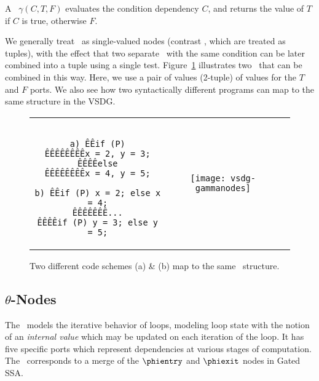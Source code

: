 A \Gn\ $\gamma(C, T, F)$ evaluates the condition dependency $C$, and returns the value of $T$ if $C$ is true, otherwise $F$.

%
We generally treat \Gns\ as single-valued nodes (contrast \Tns, which are treated as tuples), with the effect that two separate \Gns\ with the same condition can be later combined into a tuple using a single test. 
Figure~\ref{fig:twinPhis} illustrates two \Gns\ that can be combined in this way. 
Here, we use a pair of values (2-tuple) of values for the $T$ and $F$ ports. 
We also see how two syntactically different programs can map to the same structure in the VSDG.

\begin{figure}[!hb]
\centering
\begin{tabular}{ccc}	\cline{1-1}
\begin{minipage}[l]{2.0in}
\begin{verbatim}

a) ÊÊif (P)
ÊÊÊÊÊÊÊÊx = 2, y = 3;
ÊÊÊÊelse
ÊÊÊÊÊÊÊÊx = 4, y = 5;

b) ÊÊif (P) x = 2; else x = 4;
ÊÊÊÊÊÊÊ...
ÊÊÊÊif (P) y = 3; else y = 5;

\end{verbatim}
\end{minipage}	
& \hspace {0.2in}
\begin{minipage}[m][\height][l]{1.6in}
\texttt{[image: vsdg-gammanodes]}
\end{minipage} \\ \cline{1-1}
\end{tabular}

\caption{Two different code schemes (a) \& (b) map to the same
\Gn\ structure.}

\label{fig:twinPhis}
\end{figure}


\subsection{$\theta$-Nodes}

The \Tn\ models the iterative behavior of loops, modeling loop state with the notion of an \emph{internal value} which may be updated on each iteration of the loop. 
It has five specific ports which represent dependencies at various stages of computation. 
The \Tn\ corresponds to a merge of the $\phientry$ and $\phiexit$ nodes in Gated SSA.
%

